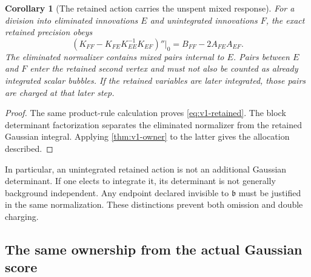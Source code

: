 \documentclass[11pt,a4paper]{article}
\newtheorem{corollary}[corollary]{Corollary}
\theoremstyle{definition}
\theoremstyle{remark}
\newcommand{\bext}{\mathfrak b}
\begin{document}
\begin{corollary}[The retained action carries the unspent mixed response]
\label{cor:v1-retained}
For a division into eliminated innovations $E$ and unintegrated
innovations $F$, the exact retained precision obeys
\begin{equation}\label{eq:v1-retained}
 \left(K_{FF}-K_{FE}K_{EE}^{-1}K_{EF}\right)''\Big|_0
                      =B_{FF}-2A_{FE}A_{EF}.
\end{equation}
The eliminated normalizer contains mixed pairs internal to $E$.
Pairs between $E$ and $F$ enter the retained second vertex and must not
also be counted as already integrated scalar bubbles. If the retained
variables are later integrated, those pairs are charged at that later
step.
\end{corollary}
\begin{proof}
The same product-rule calculation proves \cref{eq:v1-retained}. The
block determinant factorization separates the eliminated normalizer
from the retained Gaussian integral. Applying \cref{thm:v1-owner} to the
latter gives the allocation described.
\end{proof}

In particular, an unintegrated retained action is not an additional
Gaussian determinant. If one elects to integrate it, its determinant is
not generally background independent. Any endpoint declared invisible
to $\bext$ must be justified in the same normalization. These distinctions
prevent both omission and double charging.

\subsection{The same ownership from the actual Gaussian score}
\end{document}

